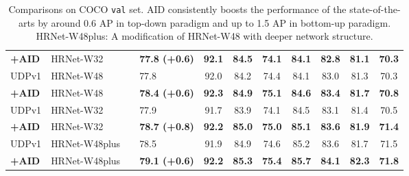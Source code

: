 \documentclass[final]{cvpr}
\begin{document}
\begin{table*}
\begin{center}
\begin{tabular}{l|l|c|lccccccc}
\textbf{+AID}            & HRNet-W32     &    &\textbf{77.8 (+0.6)}  & \textbf{92.1} & \textbf{84.5} & \textbf{74.1} &\textbf{84.1}  &\textbf{82.8} &\textbf{81.1}  &\textbf{70.3}\\
UDPv1 \cite{UDP}         & HRNet-W48     &    &77.8                 & 92.0          & 84.2          & 74.4          &84.1           &83.0          &81.3           &70.3\\
\textbf{+AID }           & HRNet-W48     &    &\textbf{78.4 (+0.6)}  & \textbf{92.3} & \textbf{84.9} & \textbf{75.1} &\textbf{84.6}  &\textbf{83.4} &\textbf{81.7}  &\textbf{70.8}\\
UDPv1 \cite{UDP}         & HRNet-W32     &    &77.9                 & 91.7          & 83.9          & 74.1          &84.5           &83.1          &81.4           &70.5\\
\textbf{+AID}            & HRNet-W32     &    &\textbf{78.7 (+0.8)}  & \textbf{92.2} & \textbf{85.0} & \textbf{75.0} &\textbf{85.1}  &\textbf{83.6} &\textbf{81.9}  &\textbf{71.4}\\
UDPv1 \cite{UDP}         & HRNet-W48plus &    &78.5                 & 91.9          & 84.9          & 74.6          &85.2           &83.6          &81.7           &71.5\\
\textbf{+AID }           & HRNet-W48plus &    &\textbf{79.1 (+0.6)}  & \textbf{92.2} & \textbf{85.3} & \textbf{75.4} &\textbf{85.7}  &\textbf{84.1} &\textbf{82.3}  &\textbf{71.8}\\
\hline

\hline
\end{tabular}
\end{center}
\caption{Comparisons on COCO \texttt{val} set. AID consistently boosts the performance of the state-of-the-arts by around 0.6 AP in top-down paradigm and up to 1.5 AP in bottom-up paradigm. HRNet-W48plus: A modification of HRNet-W48 with deeper network structure.}
\label{tab:val}
\end{table*}
\end{document}
